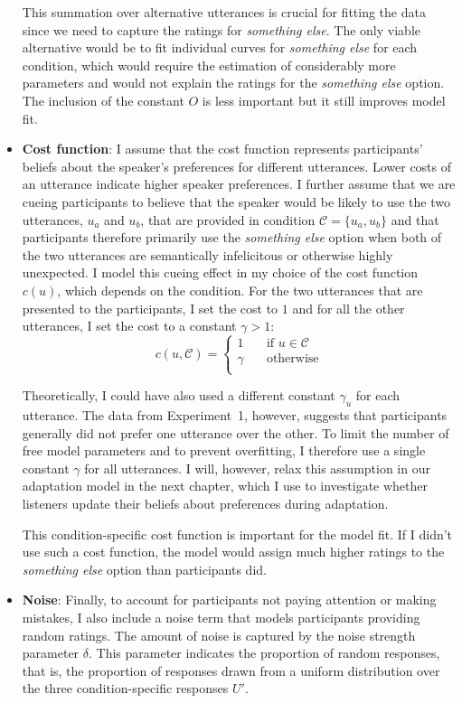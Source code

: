 \begin{itemize}
This summation over alternative utterances is crucial for fitting the data since we need to
capture the ratings for \textit{something else}. The only viable alternative would be
to fit individual curves for \textit{something else} for each condition, which would require
the estimation of considerably more parameters and would not explain the ratings for the
\textit{something else} option. The inclusion of the constant $O$ is less important but it
still improves model fit.


\item \textbf{Cost function}: I assume that the cost function represents participants' beliefs about the speaker's 
preferences for different utterances. Lower costs of an utterance indicate higher speaker preferences. I further 
assume that we are cueing participants to believe that the speaker would be likely to use the two utterances, $u_a$ 
and $u_b$, that are provided in condition $\mathscr{C}=\{u_a, u_b\}$ and that participants therefore primarily use the 
\textit{something else} option when both of the two utterances are semantically infelicitous or otherwise highly unexpected. 
I model this cueing effect in my choice of the cost function $c(u)$, which depends on the condition. For the two utterances 
that are presented to the participants, I set the cost to $1$ and for all the other utterances, I set the cost to a constant $\gamma > 1$:
$$
c(u, \mathscr{C}) = 
     \begin{cases}
       1 &\quad\text{if } u  \in \mathscr{C}\\
       \gamma &\quad\text{otherwise} \\
     \end{cases}
$$

Theoretically, I could have also used a different constant $\gamma_u$ for each utterance. The data from
Experiment~1, however, suggests that participants generally did not prefer one utterance over 
the other. To limit the number of free model parameters and to prevent overfitting, I therefore use a single
constant $\gamma$ for all utterances. I will, however, relax this assumption in our adaptation model in the next chapter, which
I use to investigate whether listeners update their beliefs about preferences during adaptation.

This condition-specific cost function is important for the model fit. If I didn't use such a cost function, 
the model would assign much higher ratings to the \textit{something else} option than participants did.

\item \textbf{Noise}: Finally, to account for participants not paying attention or making mistakes, 
I also include a noise term that models participants providing random ratings.
The amount of noise is captured by the noise strength parameter $\delta$. This parameter
indicates the proportion of random responses, that is, the proportion of responses drawn from a uniform distribution
over the three condition-specific responses $U'$. 


\end{itemize}
